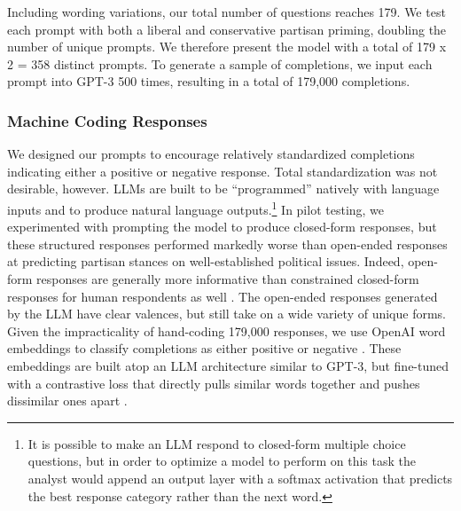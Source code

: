 \documentclass{article} %
\begin{document}
Including wording variations, our total number of questions reaches 179.
We test each prompt with both a liberal and conservative partisan
priming, doubling the number of unique prompts. We therefore present the
model with a total of 179 x 2 = 358 distinct prompts. To generate a
sample of completions, we input each prompt into GPT-3 500 times,
resulting in a total of 179,000 completions.

\subsubsection*{Machine Coding Responses}

We designed our prompts to encourage relatively standardized completions
indicating either a positive or negative response. Total standardization
was not desirable, however. LLMs are built to be ``programmed'' natively
with language inputs and to produce natural language outputs.\footnote{It
  is possible to make an LLM respond to closed-form multiple choice
  questions, but in order to optimize a model to perform on this task
  the analyst would append an output layer with a softmax activation
  that predicts the best response category rather than the next word.}
In pilot testing, we experimented with prompting the model to produce
closed-form responses, but these structured responses performed markedly
worse than open-ended responses at predicting partisan stances on
well-established political issues. Indeed, open-form responses are
generally more informative than constrained closed-form responses for
human respondents as well
\parencite{Tourangeau2000-tk, Willis2004-lr}. The open-ended responses generated by the
LLM have clear valences, but still take on a wide variety of unique
forms. Given the impracticality of hand-coding 179,000 responses, we use
OpenAI word embeddings to classify completions as either positive or
negative \parencite{Neelakantan2022-yd}. These embeddings are built atop an LLM architecture similar to
GPT-3, but fine-tuned with a contrastive loss that directly pulls
similar words together and pushes dissimilar ones apart
\parencite{Neelakantan2022-yd}.
\end{document}
